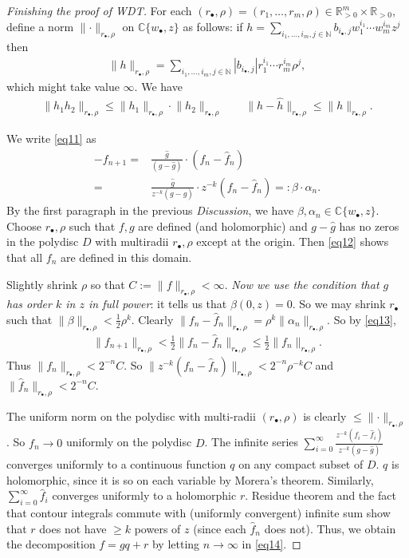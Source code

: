 \documentclass[12pt,b5paper,notitlepage]{report}
\theoremstyle{definition}
\theoremstyle{plain}
\newcommand{\wht}{\widehat}
\newcommand{\blt}{\bullet}
\newcommand{\Cbb}{\mathbb C}
\newcommand{\Nbb}{\mathbb N}
\newcommand{\Rbb}{\mathbb R}
\numberwithin{equation}{section}
\begin{document}
\begin{proof}[Finishing the proof of WDT]
For each $(r_\blt,\rho)=(r_1,\dots,r_m,\rho)\in\Rbb_{>0}^m\times\Rbb_{>0}$, define a norm $\lVert\cdot \lVert_{r_\blt,\rho}$ on $\Cbb\{w_\blt,z\}$ as follows: if $h=\sum_{i_1,\dots,i_m,j\in\Nbb}b_{i_\blt,j}w_1^{i_1}\cdots w_m^{i_m}z^j$ then
\begin{align*}
\lVert h\lVert_{r_\blt,\rho}=\sum_{i_1,\dots,i_m,j\in\Nbb}|b_{i_\blt,j}|r_1^{i_1}\cdots r_m^{i_m}\rho^j,
\end{align*}
which might take value $\infty$. We have
\begin{align}
\lVert h_1h_2\lVert_{r_\blt,\rho}\leq \lVert h_1\lVert_{r_\blt,\rho}\cdot\lVert h_2\lVert_{r_\blt,\rho}\qquad \lVert h-\wht h\lVert_{r_\blt,\rho}\leq \lVert h\lVert_{r_\blt,\rho}.\label{eq13}
\end{align}


We write \eqref{eq11} as
\begin{align}
-f_{n+1}=&\frac{\wht g}{(g-\wht g)}\cdot (f_n-\wht f_n)\nonumber\\
=&\frac{\wht g}{z^{-k}(g-\wht g)}\cdot z^{-k}(f_n-\wht f_n)=:\beta\cdot \alpha_n.\label{eq12}
\end{align}
By the first paragraph in the previous \textit{Discussion}, we have $\beta,\alpha_n\in\Cbb\{w_\blt,z\}$. Choose $r_\blt,\rho$ such that $f,g$ are defined (and holomorphic) and $g-\wht g$ has no zeros in the polydisc $D$ with multiradii $r_\blt,\rho$ except at the origin. Then \eqref{eq12} shows that all $f_n$ are defined in this domain.

Slightly shrink $\rho$ so that $C:=\lVert f\lVert_{r_\blt,\rho}<\infty$. \textit{Now we use the condition that $g$ has order $k$ in $z$ in full power}: it tells us that $\beta(0,z)=0$. So we may shrink $r_\blt$ such that $\lVert\beta\lVert_{r_\blt,\rho}<\frac 12\rho^k$. Clearly $\lVert f_n-\wht f_n\lVert_{r_\blt,\rho}=\rho^k\lVert\alpha_n\lVert_{r_\blt,\rho}$. So by \eqref{eq13}, 
\begin{align*}
\lVert f_{n+1}\lVert_{r_\blt,\rho}<\frac 12\lVert f_n-\wht f_n\lVert_{r_\blt,\rho}\leq \frac 12\lVert f_n\lVert_{r_\blt,\rho}.
\end{align*}
Thus $\lVert f_n\lVert_{r_\blt,\rho}< 2^{-n}C$. So $\lVert z^{-k}(f_n-\wht f_n)\lVert_{r_\blt,\rho}<2^{-n}\rho^{-k}C$ and $\lVert\wht f_n\lVert_{r_\blt,\rho}<2^{-n}C$.

The uniform norm on the polydisc with multi-radii $(r_\blt,\rho)$ is clearly $\leq \lVert\cdot\lVert_{r_\blt,\rho}$. So $f_n\rightarrow 0$ uniformly on the polydisc $D$. 
The infinite series $\sum_{i=0}^\infty\frac{z^{-k}(f_i-\wht f_i)}{z^{-k}(g-\wht g)}$ converges uniformly to a continuous function $q$ on any compact subset of $D$. $q$ is holomorphic, since it is so on each variable by Morera's theorem. Similarly, $\sum_{i=0}^\infty\wht f_i$ converges uniformly to a holomorphic $r$. Residue theorem and the fact that contour integrals commute with (uniformly convergent) infinite sum show that $r$ does not have $\geq k$ powers of $z$ (since each $\wht f_n$ does not). Thus, we obtain the decomposition $f=gq+r$ by letting $n\rightarrow\infty$ in \eqref{eq14}.
\end{proof}
\end{document}
